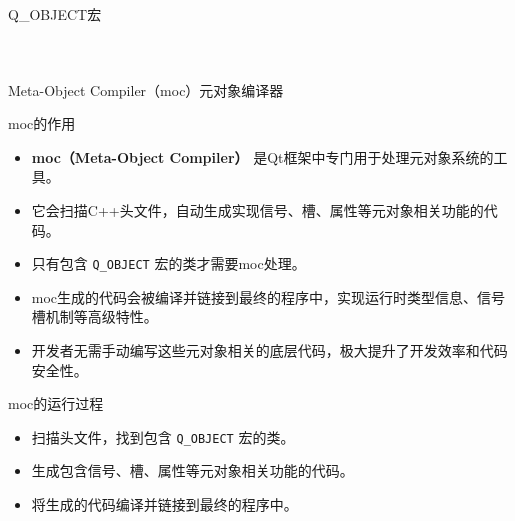 \documentclass[UTF8,aspectratio=169]{beamer}
\begin{document}
\begin{frame}[fragile]{Q\_OBJECT宏}
  \begin{columns}
    \begin{column}{0.48\textwidth}
      \inputminted[firstline=1,lastline=20]{cpp}{code/qobject_example.h}
    \end{column}
    \begin{column}{0.48\textwidth}
      \inputminted[firstline=20,lastline=40]{cpp}{code/qobject_example.h}
    \end{column}
  \end{columns}
\end{frame}

\begin{frame}{Meta-Object Compiler（moc）元对象编译器}
    \begin{ytublock}{moc的作用}
        \begin{itemize}
            \item \textbf{moc（Meta-Object Compiler）} 是Qt框架中专门用于处理元对象系统的工具。
            \item 它会扫描C++头文件，自动生成实现信号、槽、属性等元对象相关功能的代码。
            \item 只有包含 \texttt{Q\_OBJECT} 宏的类才需要moc处理。
            \item moc生成的代码会被编译并链接到最终的程序中，实现运行时类型信息、信号槽机制等高级特性。
            \item 开发者无需手动编写这些元对象相关的底层代码，极大提升了开发效率和代码安全性。
        \end{itemize}
    \end{ytublock}
    \begin{ytublock}{moc的运行过程}
        \begin{itemize}
            \item 扫描头文件，找到包含 \texttt{Q\_OBJECT} 宏的类。
            \item 生成包含信号、槽、属性等元对象相关功能的代码。
            \item 将生成的代码编译并链接到最终的程序中。
        \end{itemize}
    \end{ytublock}
\end{frame}
\end{document}
